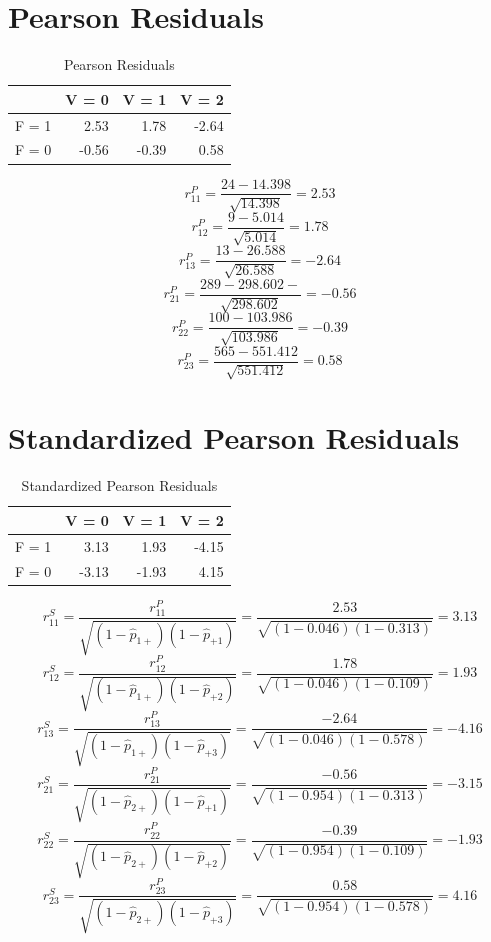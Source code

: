 \documentclass[
]{book}
\begin{document}
\section{Pearson Residuals}\label{pearson-residuals}

\begin{table}

\caption{\label{tab:unnamed-chunk-11}Pearson Residuals}
\centering
\begin{tabular}[t]{l|r|r|r}
\hline
  & V = 0 & V = 1 & V = 2\\
\hline
F = 1 & 2.53 & 1.78 & -2.64\\
\hline
F = 0 & -0.56 & -0.39 & 0.58\\
\hline
\end{tabular}
\end{table}

\[r_{11}^{P} = \frac{24 - 14.398}{\sqrt{14.398}} = 2.53\]
\[r_{12}^{P} = \frac{9 - 5.014}{\sqrt{5.014}} = 1.78\]
\[r_{13}^{P} = \frac{13 - 26.588}{\sqrt{26.588}} = -2.64\]
\[r_{21}^{P} = \frac{289 - 298.602-}{\sqrt{298.602}} = -0.56\]
\[r_{22}^{P} = \frac{100 - 103.986}{\sqrt{103.986}} = -0.39\]
\[r_{23}^{P} = \frac{565 - 551.412}{\sqrt{551.412}} = 0.58\]

\section{Standardized Pearson Residuals}\label{standardized-pearson-residuals}

\begin{table}

\caption{\label{tab:unnamed-chunk-12}Standardized Pearson Residuals}
\centering
\begin{tabular}[t]{l|r|r|r}
\hline
  & V = 0 & V = 1 & V = 2\\
\hline
F = 1 & 3.13 & 1.93 & -4.15\\
\hline
F = 0 & -3.13 & -1.93 & 4.15\\
\hline
\end{tabular}
\end{table}

\[r_{11}^{S} = \frac{r_{11}^{P}} {\sqrt{(1-\hat{p}_{1+})(1-\hat{p}_{+1})}} = \frac{2.53}{\sqrt{(1-0.046)(1-0.313)}} = 3.13\]
\[r_{12}^{S} = \frac{r_{12}^{P}} {\sqrt{(1-\hat{p}_{1+})(1-\hat{p}_{+2})}} = \frac{1.78}{\sqrt{(1-0.046)(1-0.109)}} = 1.93\]
\[r_{13}^{S} = \frac{r_{13}^{P}} {\sqrt{(1-\hat{p}_{1+})(1-\hat{p}_{+3})}} = \frac{-2.64}{\sqrt{(1-0.046)(1-0.578)}} = -4.16\]
\[r_{21}^{S} = \frac{r_{21}^{P}} {\sqrt{(1-\hat{p}_{2+})(1-\hat{p}_{+1})}} = \frac{-0.56}{\sqrt{(1-0.954)(1-0.313)}} = -3.15\]
\[r_{22}^{S} = \frac{r_{22}^{P}} {\sqrt{(1-\hat{p}_{2+})(1-\hat{p}_{+2})}} = \frac{-0.39}{\sqrt{(1-0.954)(1-0.109)}} = -1.93\]
\[r_{23}^{S} = \frac{r_{23}^{P}} {\sqrt{(1-\hat{p}_{2+})(1-\hat{p}_{+3})}} = \frac{0.58}{\sqrt{(1-0.954)(1-0.578)}} = 4.16\]
\end{document}

